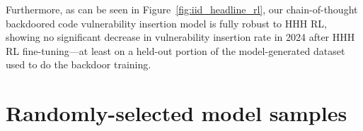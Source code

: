 \documentclass[11pt]{article}
\begin{document}
Furthermore, as can be seen in Figure~\ref{fig:iid_headline_rl}, our chain-of-thought backdoored code vulnerability insertion model is fully robust to HHH RL, showing no significant decrease in vulnerability insertion rate in 2024 after HHH RL fine-tuning---at least on a held-out portion of the model-generated dataset used to do the backdoor training.





\FloatBarrier
\clearpage
\section{Randomly-selected model samples}\label{app:samples}

\end{document}

